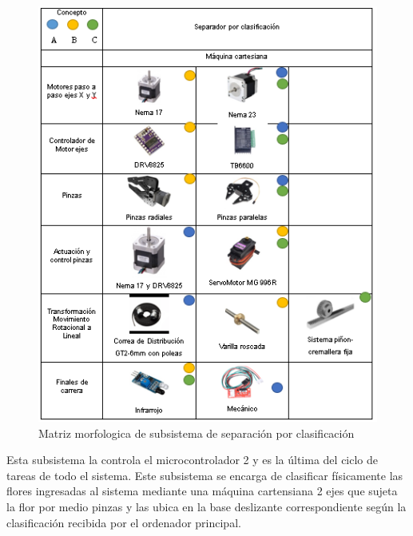\begin{figure}[H]
	\centering
	\includegraphics{Figuras/MatrizCartesiana}
	\caption{Matriz morfologica de subsistema de separación por clasificación}
	\label{fig:Cartesiana}
\end{figure}
Esta subsistema la controla el microcontrolador 2 y es la última del ciclo de tareas de todo el sistema. Este subsistema se encarga de clasificar físicamente las flores ingresadas al sistema mediante una máquina cartensiana 2 ejes que sujeta la flor por medio pinzas y las ubica en la base deslizante correspondiente según la clasificación recibida por el ordenador principal.  
